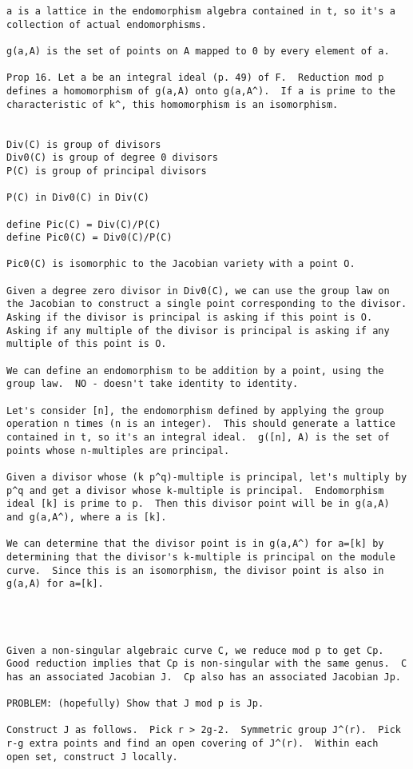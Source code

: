 {\begin{verbatim}
a is a lattice in the endomorphism algebra contained in t, so it's a
collection of actual endomorphisms.

g(a,A) is the set of points on A mapped to 0 by every element of a.

Prop 16. Let a be an integral ideal (p. 49) of F.  Reduction mod p
defines a homomorphism of g(a,A) onto g(a,A^).  If a is prime to the
characteristic of k^, this homomorphism is an isomorphism.


Div(C) is group of divisors
Div0(C) is group of degree 0 divisors
P(C) is group of principal divisors

P(C) in Div0(C) in Div(C)

define Pic(C) = Div(C)/P(C)
define Pic0(C) = Div0(C)/P(C)

Pic0(C) is isomorphic to the Jacobian variety with a point O.

Given a degree zero divisor in Div0(C), we can use the group law on
the Jacobian to construct a single point corresponding to the divisor.
Asking if the divisor is principal is asking if this point is O.
Asking if any multiple of the divisor is principal is asking if any
multiple of this point is O.

We can define an endomorphism to be addition by a point, using the
group law.  NO - doesn't take identity to identity.

Let's consider [n], the endomorphism defined by applying the group
operation n times (n is an integer).  This should generate a lattice
contained in t, so it's an integral ideal.  g([n], A) is the set of
points whose n-multiples are principal.

Given a divisor whose (k p^q)-multiple is principal, let's multiply by
p^q and get a divisor whose k-multiple is principal.  Endomorphism
ideal [k] is prime to p.  Then this divisor point will be in g(a,A)
and g(a,A^), where a is [k].

We can determine that the divisor point is in g(a,A^) for a=[k] by
determining that the divisor's k-multiple is principal on the module
curve.  Since this is an isomorphism, the divisor point is also in
g(a,A) for a=[k].




Given a non-singular algebraic curve C, we reduce mod p to get Cp.
Good reduction implies that Cp is non-singular with the same genus.  C
has an associated Jacobian J.  Cp also has an associated Jacobian Jp.

PROBLEM: (hopefully) Show that J mod p is Jp.

Construct J as follows.  Pick r > 2g-2.  Symmetric group J^(r).  Pick
r-g extra points and find an open covering of J^(r).  Within each
open set, construct J locally.

\end{verbatim}
}

